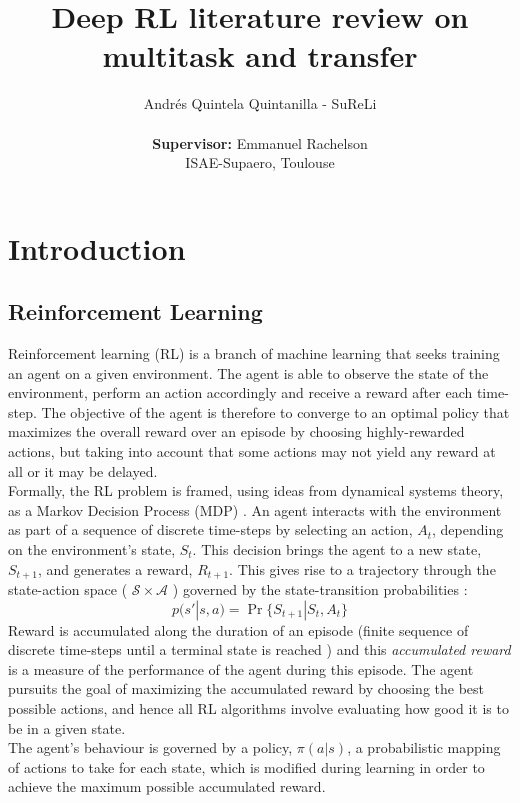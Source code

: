 \documentclass{article}
\title{Deep RL literature review on multitask and transfer}
\author{
Andrés Quintela Quintanilla - SuReLi \\
\vspace{0.1cm}\\
\textbf{Supervisor:} Emmanuel Rachelson\\
ISAE-Supaero, Toulouse
}
\begin{document}
\maketitle

\section{Introduction}
\subsection{Reinforcement Learning}
Reinforcement learning (RL) is a branch of machine learning that seeks training an agent on a given environment. The agent is able to observe the state of the environment, perform an action accordingly and receive a reward after each time-step. The objective of the agent is therefore to converge to an optimal policy that maximizes the overall reward over an episode by choosing highly-rewarded actions, but taking into account that some actions may not yield any reward at all or it may be delayed. \newline
\\
Formally, the RL problem is framed, using ideas from dynamical systems theory, as a Markov Decision Process (MDP) \cite{Sutton1998ReinforcementIntroduction}. An agent interacts with the environment as part of a sequence of discrete time-steps by selecting an action, $A_{t}$, depending on the environment's state, $S_{t}$. This decision brings the agent to a new state, $S_{t+1}$, and generates a reward, $R_{t+1}$.
This gives rise to a trajectory through the state-action space ( $\mathcal{S} \times \mathcal{A}$ ) governed by the state-transition probabilities \citep{Sutton1998ReinforcementIntroduction}:
\begin{equation}
    p(s'|s,a) = \Pr \{ S_{t+1}|S_{t}, A_{t} \}
\end{equation}
Reward is accumulated along the duration of an episode (finite sequence of discrete time-steps until a terminal state is reached \citep{Sutton1998ReinforcementIntroduction}) and this \textit{accumulated reward} is a measure of the performance of the agent during this episode. The agent pursuits the goal of maximizing the accumulated reward by choosing the best possible actions, and hence all RL algorithms involve evaluating how good it is to be in a given state. \\ 
The agent's behaviour is governed by a policy, $\pi (a|s)$, a probabilistic mapping of actions to take for each state, which is modified during learning in order to achieve the maximum possible accumulated reward.
\end{document}
